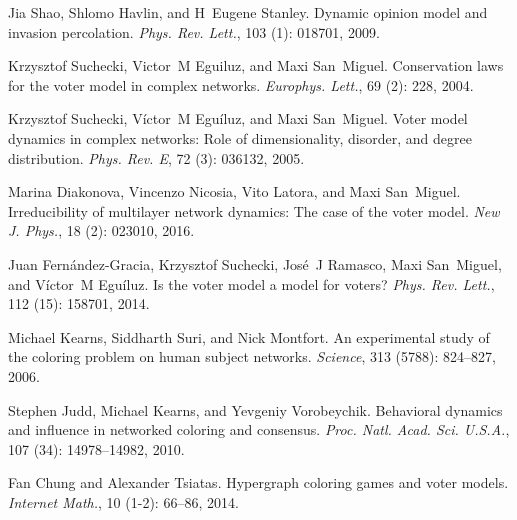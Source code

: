 Jia Shao, Shlomo Havlin, and H~Eugene Stanley.
\newblock Dynamic opinion model and invasion percolation.
\newblock \emph{Phys. Rev. Lett.}, 103 (1): 018701, 2009.

Krzysztof Suchecki, Victor~M Eguiluz, and Maxi San~Miguel.
\newblock Conservation laws for the voter model in complex networks.
\newblock \emph{Europhys. Lett.}, 69 (2): 228, 2004.

Krzysztof Suchecki, V{\'i}ctor~M Egu{\'i}luz, and Maxi San~Miguel.
\newblock Voter model dynamics in complex networks: {{Role}} of dimensionality,
disorder, and degree distribution.
\newblock \emph{Phys. Rev. E}, 72 (3): 036132, 2005.

Marina Diakonova, Vincenzo Nicosia, Vito Latora, and Maxi San~Miguel.
\newblock Irreducibility of multilayer network dynamics: The case of the voter
model.
\newblock \emph{New J. Phys.}, 18 (2): 023010, 2016.

Juan {Fern{\'a}ndez-Gracia}, Krzysztof Suchecki, Jos{\'e}~J Ramasco, Maxi
San~Miguel, and V{\'i}ctor~M Egu{\'i}luz.
\newblock Is the voter model a model for voters?
\newblock \emph{Phys. Rev. Lett.}, 112 (15): 158701, 2014.

Michael Kearns, Siddharth Suri, and Nick Montfort.
\newblock An experimental study of the coloring problem on human subject
networks.
\newblock \emph{Science}, 313 (5788): 824--827, 2006.

Stephen Judd, Michael Kearns, and Yevgeniy Vorobeychik.
\newblock Behavioral dynamics and influence in networked coloring and
consensus.
\newblock \emph{Proc. Natl. Acad. Sci. U.S.A.}, 107 (34):
14978--14982, 2010.

Fan Chung and Alexander Tsiatas.
\newblock Hypergraph coloring games and voter models.
\newblock \emph{Internet Math.}, 10 (1-2): 66--86, 2014.

